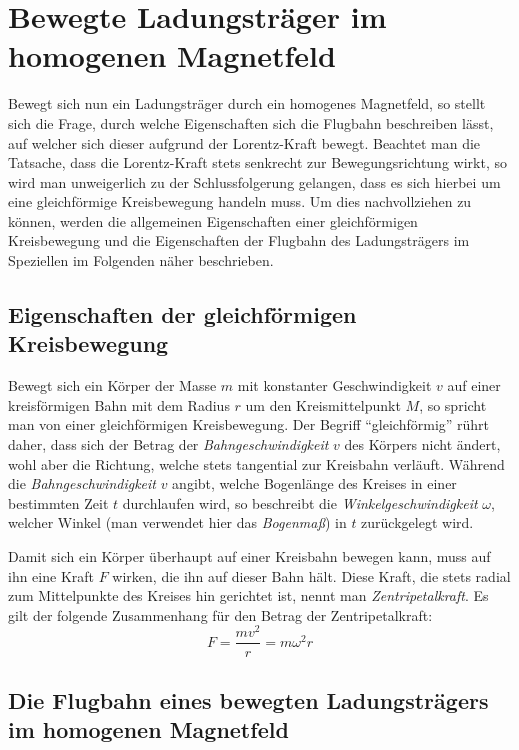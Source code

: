 \section{Bewegte Ladungstr\"ager im homogenen Magnetfeld}

Bewegt sich nun ein Ladungstr\"ager durch ein homogenes Magnetfeld, so stellt sich die Frage, durch welche Eigenschaften sich
die Flugbahn beschreiben l\"asst, auf welcher sich dieser aufgrund der Lorentz-Kraft bewegt. Beachtet man die Tatsache, dass die
Lorentz-Kraft stets senkrecht zur Bewegungsrichtung wirkt, so wird man unweigerlich zu der Schlussfolgerung gelangen, dass es sich
hierbei um eine gleichf\"ormige Kreisbewegung handeln muss. Um dies nachvollziehen zu k\"onnen, werden die allgemeinen Eigenschaften
einer gleichf\"ormigen Kreisbewegung und die Eigenschaften der Flugbahn des Ladungstr\"agers im Speziellen im Folgenden n\"aher
beschrieben.

\subsection{Eigenschaften der gleichf\"ormigen Kreisbewegung}
\label{sec:kreisbewegung}

Bewegt sich ein K\"orper der Masse \(m\) mit konstanter Geschwindigkeit \(v\) auf einer kreisf\"ormigen Bahn mit dem Radius \(r\) um den
Kreismittelpunkt \(M\), so spricht man von einer gleichf\"ormigen Kreisbewegung. Der Begriff "`gleichf\"ormig"' r\"uhrt daher,
dass sich der Betrag der \textit{Bahngeschwindigkeit} \(v\) des K\"orpers nicht \"andert, wohl aber die Richtung, welche stets
tangential zur Kreisbahn verl\"auft. W\"ahrend die \textit{Bahngeschwindigkeit} \(v\) angibt, welche Bogenl\"ange des Kreises in einer
bestimmten Zeit \(t\) durchlaufen wird, so beschreibt die \textit{Winkelgeschwindigkeit} \(\omega\), welcher Winkel (man verwendet hier
das \textit{Bogenma{\ss}}) in \(t\) zur\"uckgelegt wird.

Damit sich ein K\"orper \"uberhaupt auf einer Kreisbahn bewegen kann, muss auf ihn eine Kraft \(F\) wirken, die ihn auf dieser Bahn
h\"alt. Diese Kraft, die stets radial zum Mittelpunkte des Kreises hin gerichtet ist, nennt man \textit{Zentripetalkraft}.
Es gilt der folgende Zusammenhang f\"ur den Betrag der Zentripetalkraft:
\begin{equation}
F = \frac{mv^2}{r} = m\omega^2r
\end{equation}

\subsection{Die Flugbahn eines bewegten Ladungstr\"agers im homogenen Magnetfeld}

